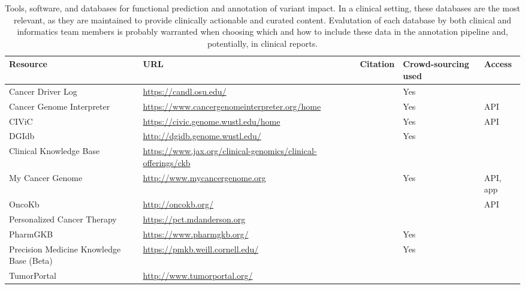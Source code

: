 \documentclass{article}
\begin{document}
\begin{table}[p]
\centering
\begin{tabularx}{\textwidth}{p{3cm}XXp{1.5cm}p{1.5cm}}
  \hline
  Resource & URL & Citation & Crowd-sourcing used & Access \\
  \hline
  Cancer Driver Log & \url{https://candl.osu.edu/} & \parencite{Damodaran2015-so} & Yes & \\
  Cancer Genome Interpreter & \url{https://www.cancergenomeinterpreter.org/home} & \parencite{Tamborero2017-ay} & Yes & API \\
  CIViC & \url{https://civic.genome.wustl.edu/home} & \parencite{Griffith2016-sy} & Yes & API \\
  DGIdb & \url{http://dgidb.genome.wustl.edu/} & \parencite{Wagner2016-fs,Griffith2013-uv} & Yes & \\
  Clinical Knowledge Base & \url{https://www.jax.org/clinical-genomics/clinical-offerings/ckb} & & & \\
  My Cancer Genome & \url{http://www.mycancergenome.org} & \parencite{Micheel2014-pz} & Yes & API, app \\
  OncoKb & \url{http://oncokb.org/} & \parencite{Chakravarty2017-gx} & & API \\
  Personalized Cancer Therapy & \url{https://pct.mdanderson.org} & & \\
  PharmGKB & \url{https://www.pharmgkb.org/} &  \parencite{Hewett2002-yu} & Yes & \\
  Precision Medicine Knowledge Base (Beta) & \url{https://pmkb.weill.cornell.edu/} & \parencite{Huang2016-zx} & Yes & \\
  TumorPortal & \url{http://www.tumorportal.org/} &
  \parencite{Lawrence2014-ss} & & \\
  \hline
\end{tabularx}
\caption{Tools, software, and databases for functional prediction and
  annotation of variant impact. In a clinical setting, these databases
are the most relevant, as they are maintained to provide clinically
actionable and curated content. Evalutation of each database by both
clinical and informatics team members is probably warranted when
choosing which and how to include these data in the annotation
pipeline and, potentially, in clinical reports.}
\label{table:3}
\end{table}
 
\end{document}
